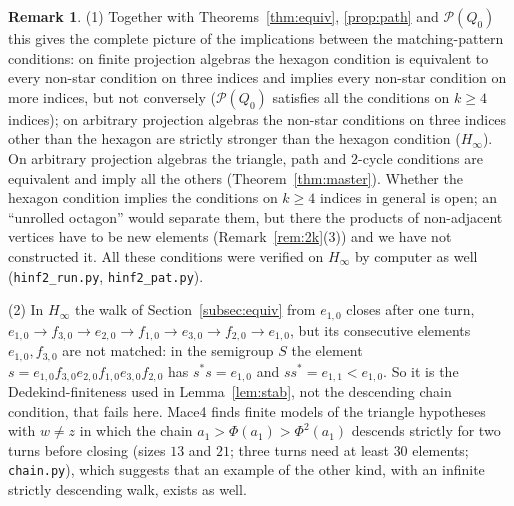 \documentclass[11pt]{amsart}
\theoremstyle{definition}
\newtheorem{remark}[theorem]{Remark}
\renewcommand{\P}{\mathcal{P}}
\begin{document}
\begin{remark}\label{rem:hinf}
(1) Together with Theorems~\ref{thm:equiv}, \ref{prop:path} and $\P(Q_0)$ this gives the complete picture of the implications between the matching-pattern conditions: on finite projection algebras the hexagon condition is equivalent to every non-star condition on three indices and implies every non-star condition on more indices, but not conversely ($\P(Q_0)$ satisfies all the conditions on $k\ge4$ indices); on arbitrary projection algebras the non-star conditions on three indices other than the hexagon are strictly stronger than the hexagon condition ($H_\infty$). On arbitrary projection algebras the triangle, path and $2$-cycle conditions are equivalent and imply all the others (Theorem~\ref{thm:master}). Whether the hexagon condition implies the conditions on $k\ge4$ indices in general is open; an ``unrolled octagon'' would separate them, but there the products of non-adjacent vertices have to be new elements (Remark~\ref{rem:2k}(3)) and we have not constructed it. All these conditions were verified on $H_\infty$ by computer as well (\texttt{hinf2\_run.py}, \texttt{hinf2\_pat.py}).

(2) In $H_\infty$ the walk of Section~\ref{subsec:equiv} from $e_{1,0}$ closes after one turn, $e_{1,0}\to f_{3,0}\to e_{2,0}\to f_{1,0}\to e_{3,0}\to f_{2,0}\to e_{1,0}$, but its consecutive elements $e_{1,0},f_{3,0}$ are not matched: in the semigroup $S$ the element $s=e_{1,0}f_{3,0}e_{2,0}f_{1,0}e_{3,0}f_{2,0}$ has $s^*s=e_{1,0}$ and $ss^*=e_{1,1}<e_{1,0}$. So it is the Dedekind-finiteness used in Lemma~\ref{lem:stab}, not the descending chain condition, that fails here. Mace4 finds finite models of the triangle hypotheses with $w\ne z$ in which the chain $a_1>\Phi(a_1)>\Phi^2(a_1)$ descends strictly for two turns before closing (sizes $13$ and $21$; three turns need at least $30$ elements; \texttt{chain.py}), which suggests that an example of the other kind, with an infinite strictly descending walk, exists as well.


\end{remark}
\end{document}
